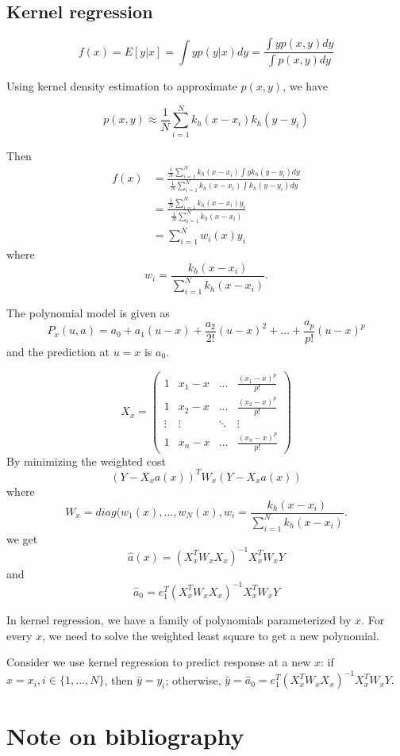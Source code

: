 \begin{refsection}
\subsection{Kernel regression}
$$f(x) = E[y|x] = \int y p(y|x) dy = \frac{\int y p(x,y)dy}{\int p(x,y)dy}$$

Using kernel density estimation to approximate $p(x,y)$, we have

$$p(x,y) \approx \frac{1}{N} \sum_{i=1}^N k_h(x-x_i)k_h(y-y_i)$$

Then
\begin{align*}
f(x) &= \frac{\frac{1}{N} \sum_{i=1}^N k_h(x-x_i)\int yk_h(y-y_i)dy}{\frac{1}{N} \sum_{i=1}^N k_h(x-x_i)\int k_h(y-y_i)dy}\\
&= \frac{\frac{1}{N} \sum_{i=1}^N k_h(x-x_i)y_i}{\frac{1}{N} \sum_{i=1}^N k_h(x-x_i)}\\
&=\sum_{i=1}^N w_i(x)y_i
\end{align*}
where
$$w_i = \frac{k_h(x-x_i)}{ \sum_{i=1}^N k_h(x-x_i)}.$$



The polynomial model is given as
$$P_x(u,a) = a_0 + a_1(u-x) + \frac{a_2}{2!}(u-x)^2 + ... + \frac{a_p}{p!}(u-x)^p$$
and the prediction at $u=x$ is $a_0$.


$$X_x = \begin{pmatrix}
1 & x_1-x & \dots & \frac{(x_1-x)^p}{p!}\\ 
1 & x_2-x & \dots & \frac{(x_2-x)^p}{p!}\\ 
\vdots & \vdots & \ddots & \vdots \\ 
1 & x_n-x & \dots & \frac{(x_n-x)^p}{p!}
\end{pmatrix}$$
By minimizing the weighted cost
$$(Y-X_x a(x))^TW_x(Y - X_x a(x))$$
where $$W_x = diag(w_1(x),...,w_N(x),w_i = \frac{k_h(x-x_i)}{ \sum_{i=1}^N k_h(x-x_i)}.$$
we get
$$\hat{a}(x) = (X_x^TW_xX_x)^{-1}X_x^TW_xY$$
and
$$\hat{a}_0 = e_1^T(X_x^TW_xX_x)^{-1}X_x^TW_xY$$


\begin{remark}[interpretation]
	In kernel regression, we have a family of polynomials parameterized by $x$. For every $x$, we need to solve the weighted least square to get a new polynomial.
\end{remark}

\begin{remark}\hfill
	Consider we use kernel regression to predict response at a new $x$: if $x = x_i,i\in \{1,...,N\}$, then $\hat{y} = y_i$; otherwise, $\hat{y} = \hat{a}_0 = e_1^T(X_x^TW_xX_x)^{-1}X_x^TW_xY. $
\end{remark}



\section{Note on bibliography}


\printbibliography
\end{refsection}





